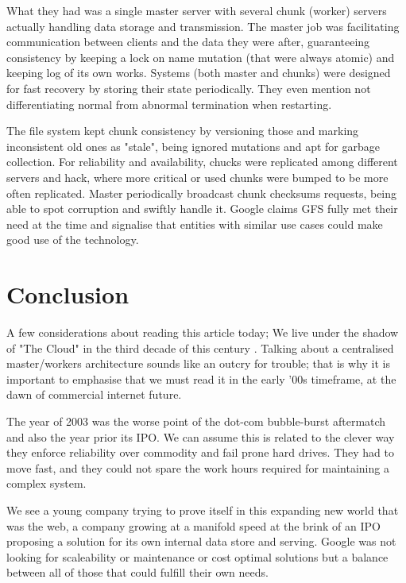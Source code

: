 \documentclass[12pt]{article}
\begin{document}
What they had was a single master server with several chunk (worker) servers actually handling data storage and transmission. The master job was facilitating communication between clients and the data they were after, guaranteeing consistency by keeping a lock on name mutation (that were always atomic) and keeping log of its own works. Systems (both master and chunks) were designed for fast recovery by storing their state periodically. They even mention not differentiating normal from abnormal termination when restarting.

The file system kept chunk consistency by versioning those and marking inconsistent old ones as "stale", being ignored mutations and apt for garbage collection. For reliability and availability, chucks were replicated among different servers and hack, where more critical or used chunks were bumped to be more often replicated. Master periodically broadcast chunk checksums requests, being able to spot corruption and swiftly handle it. Google claims GFS fully met their need at the time and signalise that entities with similar use cases could make good use of the technology.


\section{Conclusion}

A few considerations about reading this article today; We live under the shadow of "The Cloud" in the third decade of this century \cite{kazmi2016impact}. Talking about a centralised master/workers architecture sounds like an outcry for trouble; that is why it is important to emphasise that we must read it in the early '00s timeframe, at the dawn of commercial internet future\cite{leiner2009brief}.

The year of 2003 was the worse point of the dot-com bubble-burst aftermatch\cite{delong2006short} and also the year prior its IPO. We can assume this is related to the clever way they enforce reliability over commodity and fail prone hard drives. They had to move fast, and they could not spare the work hours required for maintaining a complex system.

We see a young company trying to prove itself in this expanding new world that was the web, a company growing at a manifold speed at the brink of an IPO \cite{fleischer2006branding} proposing a solution for its own internal data store and serving. Google was not looking for scaleability or maintenance or cost optimal solutions but a balance between all of those that could fulfill their own needs.




\end{document}
